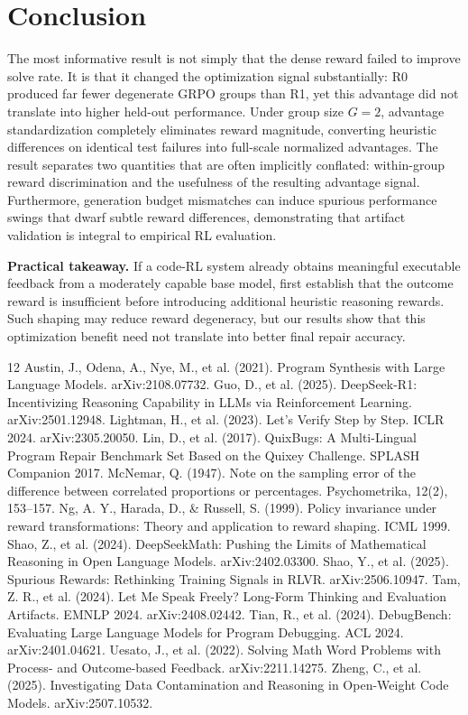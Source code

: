 \documentclass{article}
\begin{document}
\section{Conclusion}
The most informative result is not simply that the dense reward failed to improve solve rate. It is that it changed the optimization signal substantially: R0 produced far fewer degenerate GRPO groups than R1, yet this advantage did not translate into higher held-out performance. Under group size $G=2$, advantage standardization completely eliminates reward magnitude, converting heuristic differences on identical test failures into full-scale normalized advantages. The result separates two quantities that are often implicitly conflated: within-group reward discrimination and the usefulness of the resulting advantage signal. Furthermore, generation budget mismatches can induce spurious performance swings that dwarf subtle reward differences, demonstrating that artifact validation is integral to empirical RL evaluation.

\textbf{Practical takeaway.} If a code-RL system already obtains meaningful executable feedback from a moderately capable base model, first establish that the outcome reward is insufficient before introducing additional heuristic reasoning rewards. Such shaping may reduce reward degeneracy, but our results show that this optimization benefit need not translate into better final repair accuracy.


\begin{thebibliography}{12}
 Austin, J., Odena, A., Nye, M., et al. (2021). Program Synthesis with Large Language Models. arXiv:2108.07732.
 Guo, D., et al. (2025). DeepSeek-R1: Incentivizing Reasoning Capability in LLMs via Reinforcement Learning. arXiv:2501.12948.
 Lightman, H., et al. (2023). Let's Verify Step by Step. ICLR 2024. arXiv:2305.20050.
 Lin, D., et al. (2017). QuixBugs: A Multi-Lingual Program Repair Benchmark Set Based on the Quixey Challenge. SPLASH Companion 2017.
 McNemar, Q. (1947). Note on the sampling error of the difference between correlated proportions or percentages. Psychometrika, 12(2), 153--157.
 Ng, A. Y., Harada, D., \& Russell, S. (1999). Policy invariance under reward transformations: Theory and application to reward shaping. ICML 1999.
 Shao, Z., et al. (2024). DeepSeekMath: Pushing the Limits of Mathematical Reasoning in Open Language Models. arXiv:2402.03300.
 Shao, Y., et al. (2025). Spurious Rewards: Rethinking Training Signals in RLVR. arXiv:2506.10947.
 Tam, Z. R., et al. (2024). Let Me Speak Freely? Long-Form Thinking and Evaluation Artifacts. EMNLP 2024. arXiv:2408.02442.
 Tian, R., et al. (2024). DebugBench: Evaluating Large Language Models for Program Debugging. ACL 2024. arXiv:2401.04621.
 Uesato, J., et al. (2022). Solving Math Word Problems with Process- and Outcome-based Feedback. arXiv:2211.14275.
 Zheng, C., et al. (2025). Investigating Data Contamination and Reasoning in Open-Weight Code Models. arXiv:2507.10532.
\end{thebibliography}
\end{document}
